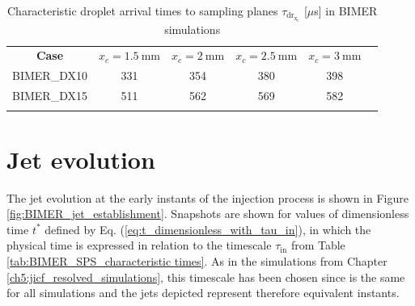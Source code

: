 \begin{table}[!h]
\centering
\caption{Characteristic droplet arrival times to sampling planes $\tau_\mathrm{dr_{x_c}}$ [$\mu$s] in BIMER simulations}
\begin{tabular}{cccccc}
\thickhline
\textbf{Case} &  $x_c = 1.5~\mathrm{mm}$ & $x_c = 2 ~ \mathrm{mm}$ & $x_c = 2.5 ~ \mathrm{mm}$ & $x_c = 3 ~ \mathrm{mm}$ \\
\thickhline 
BIMER\_DX10 & 331 & 354 & 380 & 398 \\
BIMER\_DX15 & 511 & 562 & 569 & 582 \\
\thickhline
\end{tabular}
\label{tab:BIMER_SPS_characteristic_droplet_sampling_times}
\end{table}


\section{Jet evolution}
\label{sec:ch8_BIMER_jet_evolution}

The jet evolution at the early instants of the injection process is shown in Figure \ref{fig:BIMER_jet_establishment}. Snapshots are shown for values of dimensionless time $t^*$ defined by Eq. (\ref{eq:t_dimensionless_with_tau_in}), in which the physical time is expressed in relation to the timescale $\tau_\mathrm{in}$ from Table \ref{tab:BIMER_SPS_characteristic times}. As in the simulations from Chapter \ref{ch5:jicf_resolved_simulations}, this timescale has been chosen since is the same for all simulations and the jets depicted represent therefore equivalent instants.

